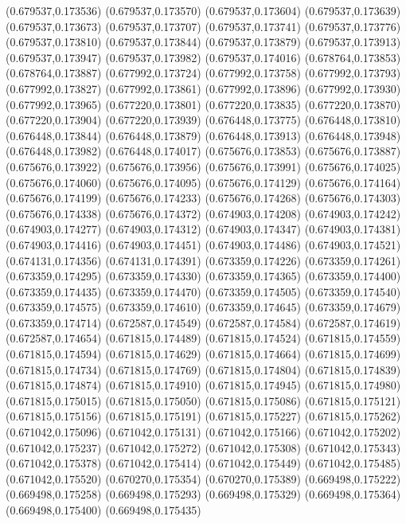 (0.679537,0.173536)
(0.679537,0.173570)
(0.679537,0.173604)
(0.679537,0.173639)
(0.679537,0.173673)
(0.679537,0.173707)
(0.679537,0.173741)
(0.679537,0.173776)
(0.679537,0.173810)
(0.679537,0.173844)
(0.679537,0.173879)
(0.679537,0.173913)
(0.679537,0.173947)
(0.679537,0.173982)
(0.679537,0.174016)
(0.678764,0.173853)
(0.678764,0.173887)
(0.677992,0.173724)
(0.677992,0.173758)
(0.677992,0.173793)
(0.677992,0.173827)
(0.677992,0.173861)
(0.677992,0.173896)
(0.677992,0.173930)
(0.677992,0.173965)
(0.677220,0.173801)
(0.677220,0.173835)
(0.677220,0.173870)
(0.677220,0.173904)
(0.677220,0.173939)
(0.676448,0.173775)
(0.676448,0.173810)
(0.676448,0.173844)
(0.676448,0.173879)
(0.676448,0.173913)
(0.676448,0.173948)
(0.676448,0.173982)
(0.676448,0.174017)
(0.675676,0.173853)
(0.675676,0.173887)
(0.675676,0.173922)
(0.675676,0.173956)
(0.675676,0.173991)
(0.675676,0.174025)
(0.675676,0.174060)
(0.675676,0.174095)
(0.675676,0.174129)
(0.675676,0.174164)
(0.675676,0.174199)
(0.675676,0.174233)
(0.675676,0.174268)
(0.675676,0.174303)
(0.675676,0.174338)
(0.675676,0.174372)
(0.674903,0.174208)
(0.674903,0.174242)
(0.674903,0.174277)
(0.674903,0.174312)
(0.674903,0.174347)
(0.674903,0.174381)
(0.674903,0.174416)
(0.674903,0.174451)
(0.674903,0.174486)
(0.674903,0.174521)
(0.674131,0.174356)
(0.674131,0.174391)
(0.673359,0.174226)
(0.673359,0.174261)
(0.673359,0.174295)
(0.673359,0.174330)
(0.673359,0.174365)
(0.673359,0.174400)
(0.673359,0.174435)
(0.673359,0.174470)
(0.673359,0.174505)
(0.673359,0.174540)
(0.673359,0.174575)
(0.673359,0.174610)
(0.673359,0.174645)
(0.673359,0.174679)
(0.673359,0.174714)
(0.672587,0.174549)
(0.672587,0.174584)
(0.672587,0.174619)
(0.672587,0.174654)
(0.671815,0.174489)
(0.671815,0.174524)
(0.671815,0.174559)
(0.671815,0.174594)
(0.671815,0.174629)
(0.671815,0.174664)
(0.671815,0.174699)
(0.671815,0.174734)
(0.671815,0.174769)
(0.671815,0.174804)
(0.671815,0.174839)
(0.671815,0.174874)
(0.671815,0.174910)
(0.671815,0.174945)
(0.671815,0.174980)
(0.671815,0.175015)
(0.671815,0.175050)
(0.671815,0.175086)
(0.671815,0.175121)
(0.671815,0.175156)
(0.671815,0.175191)
(0.671815,0.175227)
(0.671815,0.175262)
(0.671042,0.175096)
(0.671042,0.175131)
(0.671042,0.175166)
(0.671042,0.175202)
(0.671042,0.175237)
(0.671042,0.175272)
(0.671042,0.175308)
(0.671042,0.175343)
(0.671042,0.175378)
(0.671042,0.175414)
(0.671042,0.175449)
(0.671042,0.175485)
(0.671042,0.175520)
(0.670270,0.175354)
(0.670270,0.175389)
(0.669498,0.175222)
(0.669498,0.175258)
(0.669498,0.175293)
(0.669498,0.175329)
(0.669498,0.175364)
(0.669498,0.175400)
(0.669498,0.175435)
